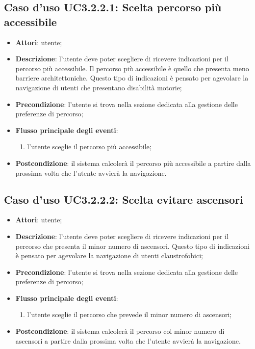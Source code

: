 \documentclass[../AnalisiDeiRequisiti.tex]{subfiles}
\begin{document}
\subsection{Caso d'uso UC3.2.2.1: Scelta percorso più accessibile}
\begin{itemize}
\item \textbf{Attori}: utente;
\item \textbf{Descrizione}: l'utente deve poter scegliere di ricevere indicazioni per il percorso più accessibile. Il percorso più accessibile è quello che presenta meno barriere architettoniche. Questo tipo di indicazioni è pensato per agevolare la navigazione di utenti che presentano disabilità motorie; 
      \item \textbf{Precondizione}: l'utente si trova nella sezione dedicata alla gestione delle preferenze di percorso;
      \item \textbf{Flusso principale degli eventi}:
          \begin{enumerate}
          \item l'utente sceglie il percorso più accessibile;
      \end{enumerate}
    \item \textbf{Postcondizione}: il sistema calcolerà il percorso più accessibile a partire dalla prossima volta che l'utente avvierà la navigazione.
  \end{itemize}
\hypertarget{UC3.2.2.2}{}
\subsection{Caso d'uso UC3.2.2.2: Scelta evitare ascensori}
\begin{itemize}
\item \textbf{Attori}: utente;
\item \textbf{Descrizione}: l'utente deve poter scegliere di ricevere indicazioni per il percorso che presenta il minor numero di ascensori. Questo tipo di indicazioni è pensato per agevolare la navigazione di utenti claustrofobici; 
      \item \textbf{Precondizione}: l'utente si trova nella sezione dedicata alla gestione delle preferenze di percorso;
      \item \textbf{Flusso principale degli eventi}:
          \begin{enumerate}
          \item l'utente sceglie il percorso che prevede il minor numero di ascensori;
      \end{enumerate}
    \item \textbf{Postcondizione}: il sistema calcolerà il percorso col minor numero di ascensori a partire dalla prossima volta che l'utente avvierà la navigazione.
  \end{itemize}
\hypertarget{UC4}{}
\end{document}
